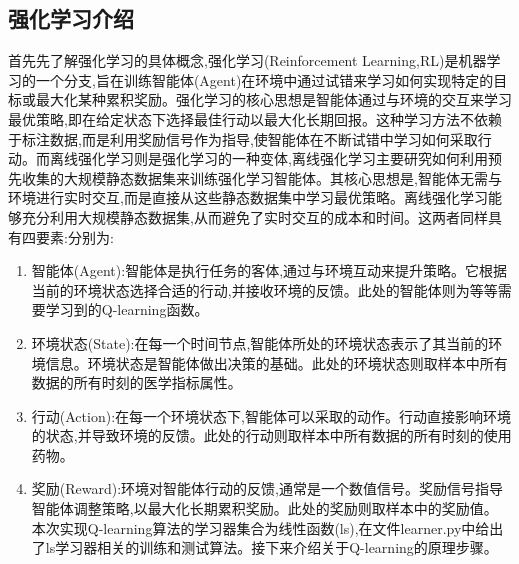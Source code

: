 \documentclass[12pt,a4paper]{ctexart}
\newenvironment{enu}{\begin{enumerate}[(1)]}{\end{enumerate}}
\theoremstyle{definition}
\begin{document}
\subsection{强化学习介绍}
首先先了解强化学习的具体概念,强化学习(Reinforcement Learning,RL)是机器学习的一个分支,旨在训练智能体(Agent)在环境中通过试错来学习如何实现特定的目标或最大化某种累积奖励。强化学习的核心思想是智能体通过与环境的交互来学习最优策略,即在给定状态下选择最佳行动以最大化长期回报。这种学习方法不依赖于标注数据,而是利用奖励信号作为指导,使智能体在不断试错中学习如何采取行动。而离线强化学习则是强化学习的一种变体,离线强化学习主要研究如何利用预先收集的大规模静态数据集来训练强化学习智能体。其核心思想是,智能体无需与环境进行实时交互,而是直接从这些静态数据集中学习最优策略。离线强化学习能够充分利用大规模静态数据集,从而避免了实时交互的成本和时间。这两者同样具有四要素:分别为:
\begin{enu} 
\item 智能体(Agent):智能体是执行任务的客体,通过与环境互动来提升策略。它根据当前的环境状态选择合适的行动,并接收环境的反馈。此处的智能体则为等等需要学习到的Q-learning函数。
\item 环境状态(State):在每一个时间节点,智能体所处的环境状态表示了其当前的环境信息。环境状态是智能体做出决策的基础。此处的环境状态则取样本中所有数据的所有时刻的医学指标属性。
\item 行动(Action):在每一个环境状态下,智能体可以采取的动作。行动直接影响环境的状态,并导致环境的反馈。此处的行动则取样本中所有数据的所有时刻的使用药物。
\item 奖励(Reward):环境对智能体行动的反馈,通常是一个数值信号。奖励信号指导智能体调整策略,以最大化长期累积奖励。此处的奖励则取样本中的奖励值。
本次实现Q-learning算法的学习器集合为线性函数(ls),在文件learner.py中给出了ls学习器相关的训练和测试算法。接下来介绍关于Q-learning的原理步骤。
\end{enu}
\end{document}
